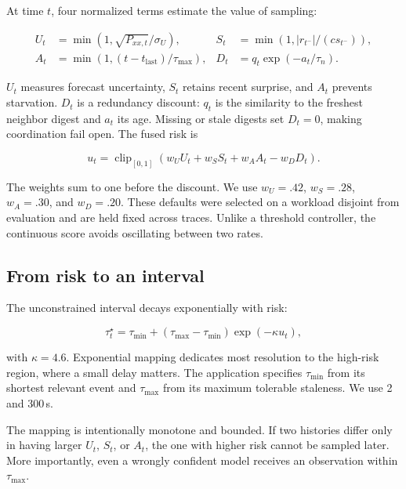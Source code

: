 At time $t$, four normalized terms estimate the value of sampling:

\begin{align}
U_t &= \min\!\left(1,\sqrt{P_{xx,t}}/\sigma_U\right), &
S_t &= \min\!\left(1,|r_{t^-}|/(c s_{t^-})\right),\\
A_t &= \min\!\left(1,(t-t_{\mathrm{last}})/\tau_{\max}\right), &
D_t &= q_t\exp(-a_t/\tau_n).
\end{align}

$U_t$ measures forecast uncertainty, $S_t$ retains recent surprise, and $A_t$
prevents starvation.  $D_t$ is a redundancy discount: $q_t$ is the similarity
to the freshest neighbor digest and $a_t$ its age.  Missing or stale digests set
$D_t=0$, making coordination fail open.  The fused risk is

\begin{equation}
\label{eq:risk}
u_t=\operatorname{clip}_{[0,1]}
 \left(w_U U_t+w_S S_t+w_A A_t-w_D D_t\right).
\end{equation}

The weights sum to one before the discount.  We use
$w_U=.42$, $w_S=.28$, $w_A=.30$, and $w_D=.20$.  These defaults were selected
on a workload disjoint from evaluation and are held fixed across traces.
Unlike a threshold controller,
the continuous score avoids oscillating between two rates.

\subsection{From risk to an interval}

The unconstrained interval decays exponentially with risk:

\begin{equation}
\label{eq:interval}
\tau_t^{\star}=\tau_{\min}+
(\tau_{\max}-\tau_{\min})\exp(-\kappa u_t),
\end{equation}

with $\kappa=4.6$.  Exponential mapping dedicates most resolution to the
high-risk region, where a small delay matters.  The application specifies
$\tau_{\min}$ from its shortest relevant event and $\tau_{\max}$ from its
maximum tolerable staleness.  We use 2 and 300\,s.

The mapping is intentionally monotone and bounded.  If two histories differ
only in having larger $U_t$, $S_t$, or $A_t$, the one with higher risk cannot be
sampled later.  More importantly, even a wrongly confident model receives an
observation within $\tau_{\max}$.

